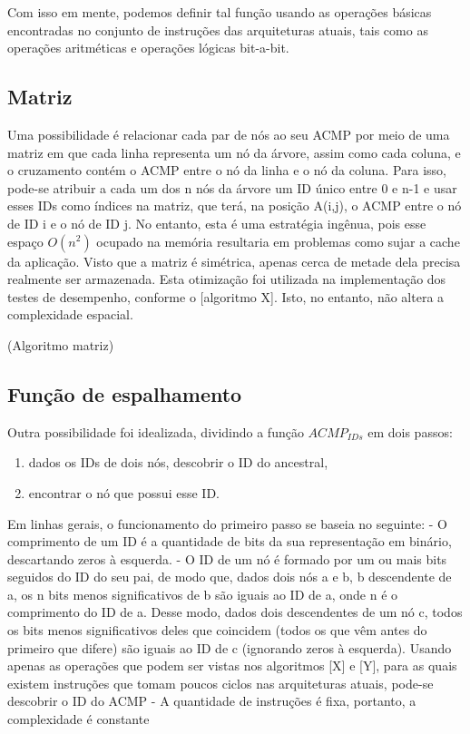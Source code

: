 Com isso em mente, podemos definir tal função usando as operações básicas encontradas no conjunto de instruções das arquiteturas atuais,
tais como as operações aritméticas e operações lógicas bit-a-bit.

\subsection{Matriz}

Uma possibilidade é relacionar cada par de nós ao seu ACMP por meio de uma matriz
em que cada linha representa um nó da árvore, assim como cada coluna, e o cruzamento contém o ACMP entre o nó da linha e o nó da coluna.
Para isso, pode-se atribuir a cada um dos n nós da árvore um ID único entre 0 e n-1 e usar esses IDs como índices na matriz,
que terá, na posição A(i,j), o ACMP entre o nó de ID i e o nó de ID j.
No entanto, esta é uma estratégia ingênua, pois esse espaço $O(n^2)$ ocupado na memória resultaria em problemas como sujar a cache da aplicação.
Visto que a matriz é simétrica, apenas cerca de metade dela precisa realmente ser armazenada.
Esta otimização foi utilizada na implementação dos testes de desempenho, conforme o [algoritmo X].
Isto, no entanto, não altera a complexidade espacial.

(Algoritmo matriz)

\subsection{Função de espalhamento}

Outra possibilidade foi idealizada, dividindo a função $ACMP_{IDs}$ em dois passos:
\begin{enumerate}
	\item dados os IDs de dois nós, descobrir o ID do ancestral,
	\item encontrar o nó que possui esse ID.
\end{enumerate}
Em linhas gerais, o funcionamento do primeiro passo se baseia no seguinte:
- O comprimento de um ID é a quantidade de bits da sua representação em binário, descartando zeros à esquerda.
- O ID de um nó é formado por um ou mais bits seguidos do ID do seu pai, de modo que, dados dois nós a e b, b descendente de a,
os n bits menos significativos de b são iguais ao ID de a, onde n é o comprimento do ID de a.
Desse modo, dados dois descendentes de um nó c, todos os bits menos significativos deles que coincidem
(todos os que vêm antes do primeiro que difere) são iguais ao ID de c (ignorando zeros à esquerda).
Usando apenas as operações que podem ser vistas nos algoritmos [X] e [Y],
para as quais existem instruções que tomam poucos ciclos nas arquiteturas atuais, pode-se descobrir o ID do ACMP
- A quantidade de instruções é fixa, portanto, a complexidade é constante

